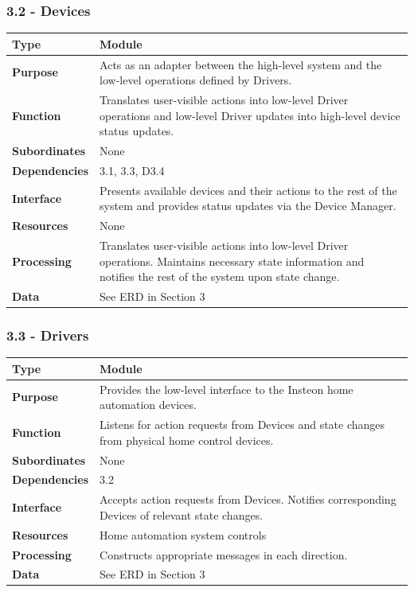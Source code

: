 \documentclass{article}
\begin{document}
\subsubsection*{3.2 - Devices}
\begin{tabular}{ | l |  p{13.3cm} |}
\hline
\textbf{Type} & Module \\ \hline
\textbf{Purpose} & Acts as an adapter between the high-level system and the
low-level operations defined by Drivers. \\ \hline
\textbf{Function} & Translates user-visible actions into low-level Driver
operations and low-level Driver updates into high-level device status updates.
\\ \hline
\textbf{Subordinates} & None \\ \hline
\textbf{Dependencies} & 3.1, 3.3, D3.4 \\ \hline
\textbf{Interface} & Presents available devices and their actions to the
rest of the system and provides status updates via the Device Manager. \\ \hline
\textbf{Resources} & None \\ \hline
\textbf{Processing} & Translates user-visible actions into low-level Driver
operations. Maintains necessary state information and notifies the rest of the
system upon state change. \\ \hline
\textbf{Data} & See ERD in Section 3 \\ \hline
\end{tabular}

\subsubsection*{3.3 - Drivers}
\begin{tabular}{ | l |  p{13.3cm} |}
\hline
\textbf{Type} & Module \\ \hline
\textbf{Purpose} & Provides the low-level interface to the Insteon home
automation devices. \\ \hline
\textbf{Function} & Listens for action requests from Devices and state changes
from physical home control devices. \\ \hline
\textbf{Subordinates} & None \\ \hline
\textbf{Dependencies} & 3.2 \\ \hline
\textbf{Interface} & Accepts action requests from Devices. Notifies
corresponding Devices of relevant state changes. \\ \hline
\textbf{Resources} & Home automation system controls \\ \hline
\textbf{Processing} & Constructs appropriate messages in each direction. \\ \hline
\textbf{Data} & See ERD in Section 3 \\ \hline
\end{tabular}
\end{document}

